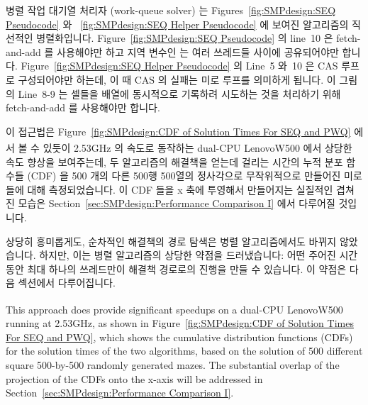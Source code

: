 병렬 작업 대기열 처리자 (work-queue solver) 는
Figures~\ref{fig:SMPdesign:SEQ Pseudocode} 와
~\ref{fig:SMPdesign:SEQ Helper Pseudocode} 에 보여진 알고리즘의 직선적인
병렬화입니다.
Figure~\ref{fig:SMPdesign:SEQ Pseudocode} 의 line~10 은 fetch-and-add 를
사용해야만 하고 지역 변수인  는 여러 쓰레드들 사이에 공유되어야만
합니다.
Figure~\ref{fig:SMPdesign:SEQ Helper Pseudocode} 의 Line~5 와~10 은 CAS 루프로
구성되어야만 하는데, 이 때 CAS 의 실패는 미로 루프를 의미하게 됩니다.
이 그림의 Line~8-9 는 셀들을  배열에 동시적으로 기록하려
시도하는 것을 처리하기 위해 fetch-and-add 를 사용해야만 합니다.

이 접근법은 Figure~\ref{fig:SMPdesign:CDF of Solution Times For SEQ and PWQ}
에서 볼 수 있듯이 2.53GHz 의 속도로 동작하는 dual-CPU
Lenovo\textsuperscript\texttrademark W500 에서 상당한 속도 향상을 보여주는데,
두 알고리즘의 해결책을 얻는데 걸리는 시간의 누적 분포 함수들 (CDF) 을 500 개의
다른 500행 500열의 정사각으로 무작위적으로 만들어진 미로들에 대해
측정되었습니다.
이 CDF 들을 x 축에 투영해서 만들어지는 실질적인 겹쳐진 모습은
Section~\ref{sec:SMPdesign:Performance Comparison I} 에서 다루어질 것입니다.

상당히 흥미롭게도, 순차적인 해결책의 경로 탐색은 병렬 알고리즘에서도 바뀌지
않았습니다.
하지만, 이는 병렬 알고리즘의 상당한 약점을 드러냈습니다:
어떤 주어진 시간 동안 최대 하나의 쓰레드만이 해결책 경로로의 진행을 만들 수
있습니다.
이 약점은 다음 섹션에서 다루어집니다.
\iffalse


This approach does provide significant speedups on a dual-CPU
Lenovo\textsuperscript\texttrademark W500
running at 2.53GHz, as shown in
Figure~\ref{fig:SMPdesign:CDF of Solution Times For SEQ and PWQ},
which shows the cumulative distribution functions (CDFs) for the solution
times of the two algorithms, based on the solution of 500 different square
500-by-500 randomly generated mazes.
The substantial overlap
of the projection of the CDFs onto the x-axis will be addressed in
Section~\ref{sec:SMPdesign:Performance Comparison I}.

